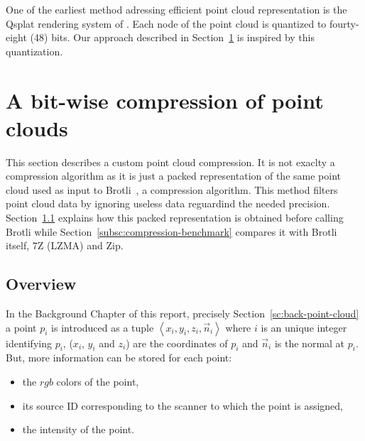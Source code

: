 One of the earliest method adressing efficient point cloud representation is the Qsplat rendering system of \cite{qsplat}. Each node of the point cloud is quantized to fourty-eight (48) bits. Our approach described in Section~\ref{sc:custom-compression} is inspired by this quantization.

\section{A bit-wise compression of point clouds}
\label{sc:custom-compression}
This section describes a custom point cloud compression. It is not exaclty a compression algorithm as it is just a packed representation of the same point cloud used as input to Brotli~\cite{brotli}, a compression algorithm. This method filters point cloud data by ignoring useless data reguardind the needed precision. Section~\ref{subsc:overview-packed} explains how this packed representation is obtained before calling Brotli while Section~\ref{subsc:compression-benchmark} compares it with Brotli itself, 7Z (LZMA) and Zip.

\subsection{Overview}
\label{subsc:overview-packed}
In the Background Chapter of this report, precisely Section~\ref{sc:back-point-cloud} a point $p_i$ is introduced as a tuple $\left\langle x_i, y_i, z_i, \vec{n}_i \right\rangle$ where $i$ is an unique integer identifying $p_i$, ($x_i$, $y_i$ and $z_i$) are the coordinates of $p_i$ and $\vec{n}_i$ is the normal at $p_i$. But, more information can be stored for each point:
\begin{itemize}
\item the $rgb$ colors of the point,
\item its source ID corresponding to the scanner to which the point is assigned,
\item the intensity of the point.
\end{itemize}

